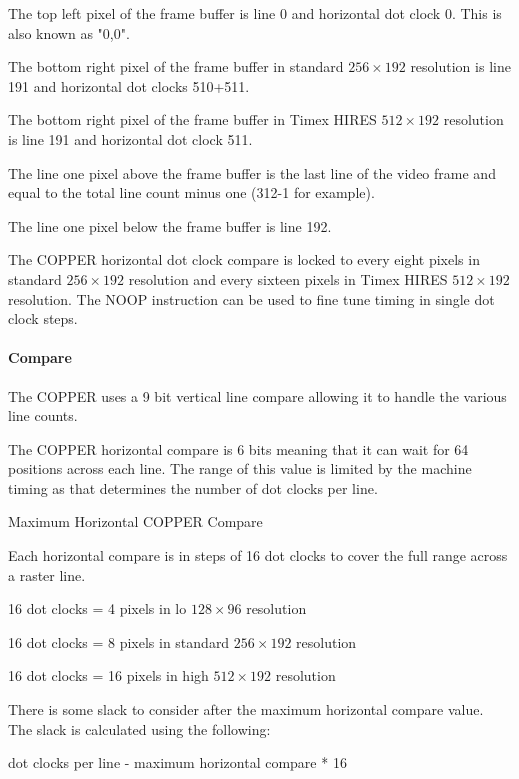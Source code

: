 The top left pixel of the frame buffer is line 0 and horizontal dot
clock 0. This is also known as "0,0".

The bottom right pixel of the frame buffer in standard $256\times192$
resolution is line 191 and horizontal dot clocks 510+511.

The bottom right pixel of the frame buffer in Timex HIRES
$512\times192$ resolution is line 191 and horizontal dot clock 511.

The line one pixel above the frame buffer is the last line of the
video frame and equal to the total line count minus one (312-1 for
example).

The line one pixel below the frame buffer is line 192.

The COPPER horizontal dot clock compare is locked to every eight
pixels in standard $256\times192$ resolution and every sixteen pixels
in Timex HIRES $512\times192$ resolution. The NOOP instruction can be
used to fine tune timing in single dot clock steps.

\paragraph{Compare}

The COPPER uses a 9 bit vertical line compare allowing it to handle
the various line counts.

The COPPER horizontal compare is 6 bits meaning that it can wait for
64 positions across each line. The range of this value is limited by
the machine timing as that determines the number of dot clocks per
line.

\begin{table}[h]\centering
  \caption{Maximum Horizontal COPPER Compare}
\end{table}

Each horizontal compare is in steps of 16 dot clocks to cover the full
range across a raster line.

16 dot clocks = 4 pixels in lo $128\times96$ resolution

16 dot clocks = 8 pixels in standard $256\times192$ resolution

16 dot clocks = 16 pixels in high $512\times192$ resolution

There is some slack to consider after the maximum horizontal compare
value. The slack is calculated using the following:

dot clocks per line - maximum horizontal compare * 16
          

